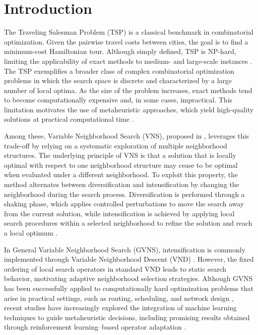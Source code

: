 \documentclass[runningheads]{llncs}
\begin{document}
\section{Introduction}

The Traveling Salesman Problem (TSP) is a classical benchmark in combinatorial optimization. Given the pairwise travel costs between cities, the goal is to find a minimum-cost Hamiltonian tour. Although simply defined, TSP is NP-hard, limiting the applicability of exact methods to medium- and large-scale instances \cite{lawler1985tsp}.
The TSP exemplifies a broader class of complex combinatorial optimization problems in which the search space is discrete and characterized by a large number of local optima. As the size of the problem increases, exact methods tend to become computationally expensive and, in some cases, impractical. This limitation motivates the use of metaheuristic approaches, which yield high-quality solutions at practical computational time \cite{osman1996meta}. 

Among these, Variable Neighborhood Search (VNS), proposed in \cite{mladenovic1997vns}, leverages this trade-off by relying on a systematic exploration of multiple neighborhood structures. The underlying principle of VNS is that a solution that is locally optimal with respect to one neighborhood structure may cease to be optimal when evaluated under a different neighborhood. To exploit this property, the method alternates between diversification and intensification by changing the neighborhood during the search process. Diversification is performed through a shaking phase, which applies controlled perturbations to move the search away from the current solution, while intensification is achieved by applying local search procedures within a selected neighborhood to refine the solution and reach a local optimum \cite{KARIMIMAMAGHAN2022393}.

In General Variable Neighborhood Search (GVNS), intensification is commonly implemented through Variable Neighborhood Descent (VND) \cite{HANSEN2017423}. However, the fixed ordering of local search operators in standard VND leads to static search behavior, motivating adaptive neighborhood selection strategies. Although GVNS has been successfully applied to computationally hard optimization problems that arise in practical settings, such as routing, scheduling, and network design \cite{DASILVA2010203,MENENDEZ201782,VENKATESH2018189,KARAKOSTAS2019263,KARAKOSTAS2020106913}, recent studies have increasingly explored the integration of machine learning techniques to guide metaheuristic decisions, including promising results obtained through reinforcement learning–based operator adaptation \cite{QUEIROZDOSSANTOS20144939,TODOSIJEVIC2016873,KARAKOSTAS2022108746}. 
\end{document}
